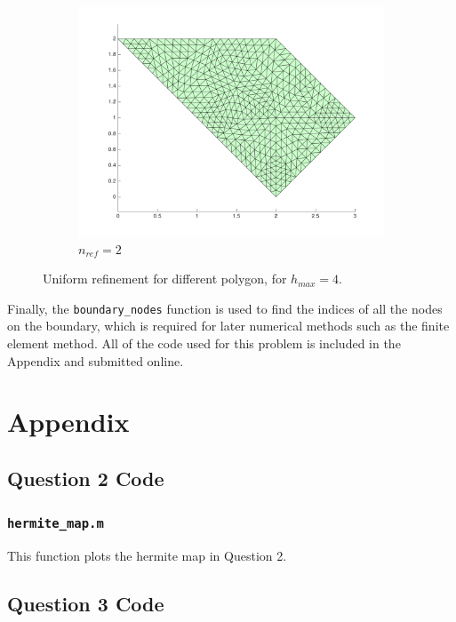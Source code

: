 \documentclass[10pt]{article}
\begin{document}
\begin{figure}[H]
\begin{subfigure}[b]{0.35\textwidth}
                \includegraphics[width=\textwidth]{refine-B2.png}
                \caption{\(n_{ref}=2\)}
        \end{subfigure}%
        \caption{Uniform refinement for different polygon, for \(h_{max}=4\).}
        \label{fig:2}
\end{figure}

Finally, the {\tt boundary\_nodes} function is used to find the indices of all the nodes on the boundary, which is required for later numerical methods such as the finite element method. All of the code used for this problem is included in the Appendix and submitted online. 

\section{Appendix}

\subsection{Question 2 Code}
\subsubsection{{\tt hermite\_map.m}}

This function plots the hermite map in Question 2.



\subsection{Question 3 Code}
\end{document}
